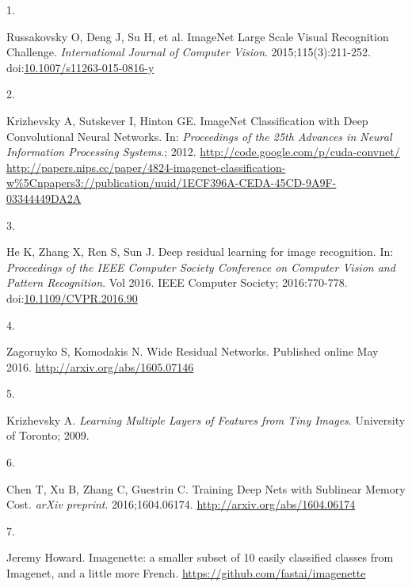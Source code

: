 \documentclass[
  12pt,
  a5,margin=2cmpaper,
]{article}
\newlength{\cslhangindent}
\newlength{\csllabelwidth}
\newlength{\cslentryspacingunit} %
\newenvironment{CSLReferences}[2] %
 {%
  \setlength{\parindent}{0pt}
  \ifodd #1
  \let\oldpar\par
  \def\par{\hangindent=\cslhangindent\oldpar}
  \fi
  \setlength{\parskip}{#2\cslentryspacingunit}
 }%
 {}
\newcommand{\CSLLeftMargin}[1]{\parbox[t]{\csllabelwidth}{#1}}
\newcommand{\CSLRightInline}[1]{\parbox[t]{\linewidth - \csllabelwidth}{#1}\break}
\begin{document}
\hypertarget{refs}{}
\begin{CSLReferences}{0}{0}
\leavevmode{}%
\CSLLeftMargin{1. }%
\CSLRightInline{Russakovsky O, Deng J, Su H, et al. {ImageNet Large
Scale Visual Recognition Challenge}. \emph{International Journal of
Computer Vision}. 2015;115(3):211-252.
doi:\href{https://doi.org/10.1007/s11263-015-0816-y}{10.1007/s11263-015-0816-y}}

\leavevmode{}%
\CSLLeftMargin{2. }%
\CSLRightInline{Krizhevsky A, Sutskever I, Hinton GE. {ImageNet
Classification with Deep Convolutional Neural Networks}. In:
\emph{Proceedings of the 25th Advances in Neural Information Processing
Systems}.; 2012.
\href{http://code.google.com/p/cuda-convnet/\%20http://papers.nips.cc/paper/4824-imagenet-classification-w\%5Cnpapers3://publication/uuid/1ECF396A-CEDA-45CD-9A9F-03344449DA2A}{http://code.google.com/p/cuda-convnet/
http://papers.nips.cc/paper/4824-imagenet-classification-w\%5Cnpapers3://publication/uuid/1ECF396A-CEDA-45CD-9A9F-03344449DA2A}}

\leavevmode{}%
\CSLLeftMargin{3. }%
\CSLRightInline{He K, Zhang X, Ren S, Sun J. {Deep residual learning for
image recognition}. In: \emph{Proceedings of the IEEE Computer Society
Conference on Computer Vision and Pattern Recognition}. Vol 2016. IEEE
Computer Society; 2016:770-778.
doi:\href{https://doi.org/10.1109/CVPR.2016.90}{10.1109/CVPR.2016.90}}

\leavevmode{}%
\CSLLeftMargin{4. }%
\CSLRightInline{Zagoruyko S, Komodakis N. {Wide Residual Networks}.
Published online May 2016. \url{http://arxiv.org/abs/1605.07146}}

\leavevmode{}%
\CSLLeftMargin{5. }%
\CSLRightInline{Krizhevsky A. \emph{{Learning Multiple Layers of
Features from Tiny Images}}. University of Toronto; 2009.}

\leavevmode{}%
\CSLLeftMargin{6. }%
\CSLRightInline{Chen T, Xu B, Zhang C, Guestrin C. {Training Deep Nets
with Sublinear Memory Cost}. \emph{arXiv preprint}. 2016;1604.06174.
\url{http://arxiv.org/abs/1604.06174}}

\leavevmode{}%
\CSLLeftMargin{7. }%
\CSLRightInline{Jeremy Howard. {Imagenette: a smaller subset of 10
easily classified classes from Imagenet, and a little more French}.
\url{https://github.com/fastai/imagenette}}


\end{CSLReferences}
\end{document}
